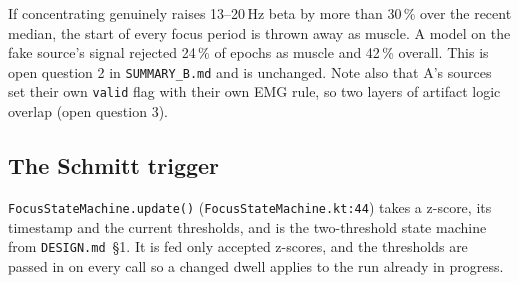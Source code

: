\documentclass[10pt,a4paper]{article}
\newcommand{\file}[1]{\texttt{\small #1}}          %
\newcommand{\code}[1]{\texttt{#1}}                  %
\begin{document}
\begin{gotcha}
If concentrating genuinely raises 13--20\,Hz beta by more than 30\,\% over the recent median, the
start of every focus period is thrown away as muscle. A model on the fake source's signal rejected
24\,\% of epochs as muscle and 42\,\% overall. This is open question 2 in \file{SUMMARY\_B.md} and
is unchanged. Note also that A's sources set their own \code{valid} flag with their own EMG rule,
so two layers of artifact logic overlap (open question 3).
\end{gotcha}

\subsection{The Schmitt trigger}

\code{FocusStateMachine.update()} (\file{FocusStateMachine.kt:44}) takes a z-score, its timestamp
and the current thresholds, and is the two-threshold state machine from \file{DESIGN.md}~\S1. It is
fed only accepted z-scores, and
the thresholds are passed in on every call so a changed dwell applies to the run already in
progress.
\end{document}
